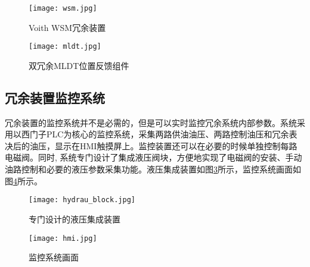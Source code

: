 \documentclass[UTF8,a1paper,twoside,11pt]{article}
\begin{document}
{\begin{multicols}{2}
\begin{figure}[H]
\begin{center}
\texttt{[image: wsm.jpg]}
\caption{Voith WSM冗余装置}
\label{fig:wsm}
\end{center}
\end{figure}


\begin{figure}[H]
\begin{center}
\texttt{[image: mldt.jpg]}
\caption{双冗余MLDT位置反馈组件}
\label{fig:mldt}
\end{center}
\end{figure}

\subsection*{冗余装置监控系统}
冗余装置的监控系统并不是必需的，但是可以实时监控冗余系统内部参数。系统采用以西门子PLC为核心的监控系统，采集两路供油油压、两路控制油压和冗余表决后的油压，显示在HMI触摸屏上。监控装置还可以在必要的时候单独控制每路电磁阀。同时, 系统专门设计了集成液压阀块，方便地实现了电磁阀的安装、手动油路控制和必要的液压参数采集功能。液压集成装置如图\ref{fig:hydrau_block}所示，监控系统画面如图\ref{fig:hmi}所示。\par

\begin{figure}[H]
\begin{center}
\texttt{[image: hydrau\_block.jpg]}
\caption{专门设计的液压集成装置}
\label{fig:hydrau_block}
\end{center}
\end{figure}


\begin{figure}[H]
\begin{center}
\texttt{[image: hmi.jpg]}
\caption{监控系统画面}
\label{fig:hmi}
\end{center}
\end{figure}


\end{multicols}}
\end{document}
